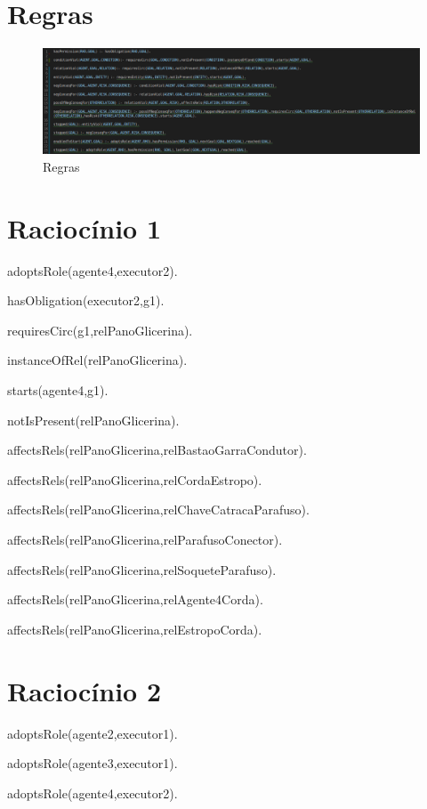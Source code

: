 \section{Regras}

\begin{figure}[H]
  \centering
  \includegraphics[width=1.1\linewidth]{figure/rules} 
  \caption{Regras}
  \label{atividiagram2}
\end{figure}



\section{Raciocínio 1}

adoptsRole(agente4,executor2).

hasObligation(executor2,g1).

requiresCirc(g1,relPanoGlicerina).

instanceOfRel(relPanoGlicerina). 

starts(agente4,g1).

notIsPresent(relPanoGlicerina).

affectsRels(relPanoGlicerina,relBastaoGarraCondutor).

affectsRels(relPanoGlicerina,relCordaEstropo).

affectsRels(relPanoGlicerina,relChaveCatracaParafuso).

affectsRels(relPanoGlicerina,relParafusoConector).

affectsRels(relPanoGlicerina,relSoqueteParafuso).

affectsRels(relPanoGlicerina,relAgente4Corda).

affectsRels(relPanoGlicerina,relEstropoCorda).


\section{Raciocínio 2}

adoptsRole(agente2,executor1). 

adoptsRole(agente3,executor1).	 	

adoptsRole(agente4,executor2).	 

